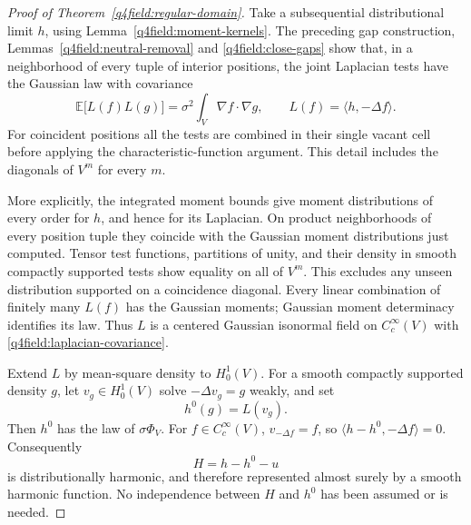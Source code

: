\begin{proof}[Proof of Theorem~\ref{q4field:regular-domain}]
Take a subsequential distributional limit $h$, using
Lemma~\ref{q4field:moment-kernels}.  The preceding gap construction,
Lemmas~\ref{q4field:neutral-removal} and \ref{q4field:close-gaps}
show that, in a neighborhood of every tuple of interior positions,
the joint Laplacian tests have the Gaussian law with covariance
\begin{equation}\label{q4field:laplacian-covariance}
 \mathbb E\bigl[L(f)L(g)\bigr]
       =\sigma^2\int_V\nabla f\cdot\nabla g,
 \qquad L(f)=\langle h,-\Delta f\rangle.
\end{equation}
For coincident positions all the tests are combined in their single
vacant cell before applying the characteristic-function argument.
This detail includes the diagonals of $V^m$ for every $m$.

More explicitly, the integrated moment bounds give moment
distributions of every order for $h$, and hence for its Laplacian.
On product neighborhoods of every position tuple they coincide with
the Gaussian moment distributions just computed.  Tensor test
functions, partitions of unity, and their density in smooth compactly
supported tests show equality on all of $V^m$.  This excludes any
unseen distribution supported on a coincidence diagonal.  Every
linear combination of finitely many $L(f)$ has the Gaussian moments;
Gaussian moment determinacy identifies its law.  Thus $L$ is a
centered Gaussian isonormal field on $C_c^\infty(V)$ with
\eqref{q4field:laplacian-covariance}.

Extend $L$ by mean-square density to $H_0^1(V)$.  For a smooth
compactly supported density $g$, let $v_g\in H_0^1(V)$ solve
$-\Delta v_g=g$ weakly, and set
\[
 h^0(g)=L(v_g).
\]
Then $h^0$ has the law of $\sigma\Phi_V$.  For
$f\in C_c^\infty(V)$, $v_{-\Delta f}=f$, so
$\langle h-h^0,-\Delta f\rangle=0$.  Consequently
\begin{equation}\label{q4field:harmonic-ambiguity}
 H=h-h^0-u
\end{equation}
is distributionally harmonic, and therefore represented almost
surely by a smooth harmonic function.  No independence between $H$
and $h^0$ has been assumed or is needed.


\end{proof}
